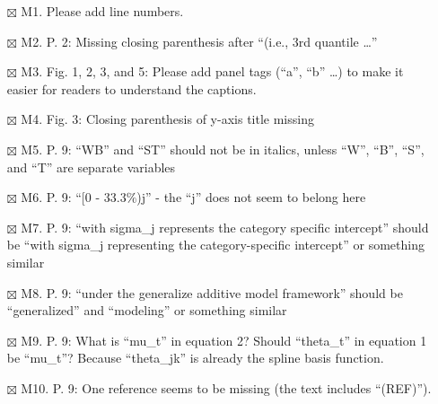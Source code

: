 \documentclass[
]{article}
\begin{document}
\begin{itemize}
\item[$\boxtimes$]
  M1. Please add line numbers.
\item[$\boxtimes$]
  M2. P. 2: Missing closing parenthesis after ``(i.e., 3rd quantile
  \ldots{}''
\item[$\boxtimes$]
  M3. Fig. 1, 2, 3, and 5: Please add panel tags (``a'', ``b'' \ldots)
  to make it easier for readers to understand the captions.
\item[$\boxtimes$]
  M4. Fig. 3: Closing parenthesis of y-axis title missing
\item[$\boxtimes$]
  M5. P. 9: ``WB'' and ``ST'' should not be in italics, unless ``W'',
  ``B'', ``S'', and ``T'' are separate variables
\item[$\boxtimes$]
  M6. P. 9: ``{[}0 - 33.3\(\%\))j'' - the ``j'' does not seem to belong
  here
\item[$\boxtimes$]
  M7. P. 9: ``with sigma\_j represents the category specific intercept''
  should be ``with sigma\_j representing the category-specific
  intercept'' or something similar
\item[$\boxtimes$]
  M8. P. 9: ``under the generalize additive model framework'' should be
  ``generalized'' and ``modeling'' or something similar
\item[$\boxtimes$]
  M9. P. 9: What is ``mu\_t'' in equation 2? Should ``theta\_t'' in
  equation 1 be ``mu\_t''? Because ``theta\_jk'' is already the spline
  basis function.
\item[$\boxtimes$]
  M10. P. 9: One reference seems to be missing (the text includes
  ``(REF)'').
\end{itemize}
\end{document}
